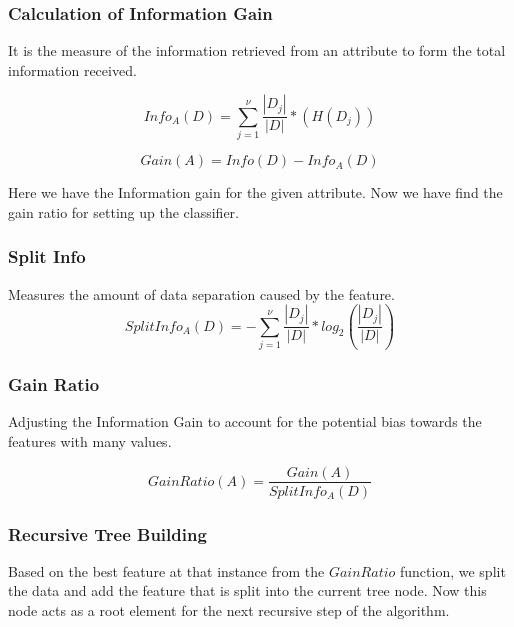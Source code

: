 \documentclass{article}
\begin{document}
\subsubsection{Calculation of Information Gain}
It is the measure of the information retrieved from an attribute to form the total information received.

\begin{equation}
    Info_A(D) = \sum_{j=1}^{\nu} \frac{|D_j|}{|D|}*(H(D_j))
\end{equation}

\begin{equation}
    Gain(A) = Info(D) - Info_A(D)
\end{equation}

Here we have the Information gain for the given attribute. Now we have find the gain ratio for setting up the classifier.

\subsubsection{Split Info}
Measures the amount of data separation caused by the feature.
\begin{equation}
    SplitInfo_A(D) = -\sum_{j=1}^{\nu} \frac{|D_j|}{|D|}*log_2(\frac{|D_j|}{|D|})
\end{equation}

\subsubsection{Gain Ratio}
Adjusting the Information Gain to account for the potential bias towards the features with many values.


\begin{equation}
    GainRatio(A) = \frac{Gain(A)}{SplitInfo_A(D)}
\end{equation}

\subsubsection{Recursive Tree Building}
Based on the best feature at that instance from the $GainRatio$ function, we split the data and add the feature that is split into the current tree node. Now this node acts as a root element for the next recursive step of the algorithm.
\end{document}
